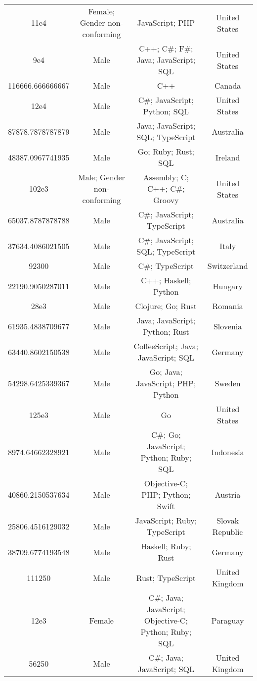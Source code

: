 \begin{center}
\begin{tabular}{ |c|c|c|c| }
11e4  &  Female; Gender non-conforming  &  JavaScript; PHP  &  United States  \\ 
9e4  &  Male  &  C++; C\#; F\#; Java; JavaScript; SQL  &  United States  \\ 
116666.666666667  &  Male  &  C++  &  Canada  \\ 
12e4  &  Male  &  C\#; JavaScript; Python; SQL  &  United States  \\ 
87878.7878787879  &  Male  &  Java; JavaScript; SQL; TypeScript  &  Australia  \\ 
48387.0967741935  &  Male  &  Go; Ruby; Rust; SQL  &  Ireland  \\ 
102e3  &  Male; Gender non-conforming  &  Assembly; C; C++; C\#; Groovy  &  United States  \\ 
65037.8787878788  &  Male  &  C\#; JavaScript; TypeScript  &  Australia  \\ 
37634.4086021505  &  Male  &  C\#; JavaScript; SQL; TypeScript  &  Italy  \\ 
92300  &  Male  &  C\#; TypeScript  &  Switzerland  \\ 
22190.9050287011  &  Male  &  C++; Haskell; Python  &  Hungary  \\ 
28e3  &  Male  &  Clojure; Go; Rust  &  Romania  \\ 
61935.4838709677  &  Male  &  Java; JavaScript; Python; Rust  &  Slovenia  \\ 
63440.8602150538  &  Male  &  CoffeeScript; Java; JavaScript; SQL  &  Germany  \\ 
54298.6425339367  &  Male  &  Go; Java; JavaScript; PHP; Python  &  Sweden  \\ 
125e3  &  Male  &  Go  &  United States  \\ 
8974.64662328921  &  Male  &  C\#; Go; JavaScript; Python; Ruby; SQL  &  Indonesia  \\ 
40860.2150537634  &  Male  &  Objective-C; PHP; Python; Swift  &  Austria  \\ 
25806.4516129032  &  Male  &  JavaScript; Ruby; TypeScript  &  Slovak Republic  \\ 
38709.6774193548  &  Male  &  Haskell; Ruby; Rust  &  Germany  \\ 
111250  &  Male  &  Rust; TypeScript  &  United Kingdom  \\ 
12e3  &  Female  &  C\#; Java; JavaScript; Objective-C; Python; Ruby; SQL  &  Paraguay  \\ 
56250  &  Male  &  C\#; Java; JavaScript; SQL  &  United Kingdom  \\ 

\end{tabular}
\end{center}
